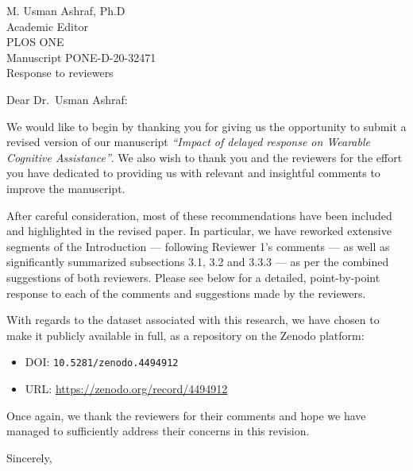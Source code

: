 \documentclass[10pt, letterpaper]{letter}
\begin{document}
\begin{letter}{
    M. Usman Ashraf, Ph.D\\
    Academic Editor\\
    PLOS ONE\\
    \medskip
    Manuscript PONE-D-20-32471\\
    Response to reviewers\\
}

\opening{Dear Dr.\ Usman Ashraf:}

We would like to begin by thanking you for giving us the opportunity to submit a revised version of our manuscript \emph{``Impact of delayed response on Wearable Cognitive Assistance''}.
We also wish to thank you and the reviewers for the effort you have dedicated to providing us with relevant and insightful comments to improve the manuscript.

After careful consideration, most of these recommendations have been included and highlighted in the revised paper.
In particular, we have reworked extensive segments of the Introduction --- following Reviewer 1's comments --- as well as significantly summarized subsections 3.1, 3.2 and 3.3.3 --- as per the combined suggestions of both reviewers.
Please see below for a detailed, point-by-point response to each of the comments and suggestions made by the reviewers.

With regards to the dataset associated with this research, we have chosen to make it publicly available in full, as a repository on the Zenodo platform:
\begin{itemize}
    \item DOI: \texttt{10.5281/zenodo.4494912}
    \item URL: \href{https://zenodo.org/record/4494912}{\url{https://zenodo.org/record/4494912}}
\end{itemize}



Once again, we thank the reviewers for their comments and hope we have managed to sufficiently address their concerns in this revision.

\closing{Sincerely,}


\end{letter}
\end{document}
